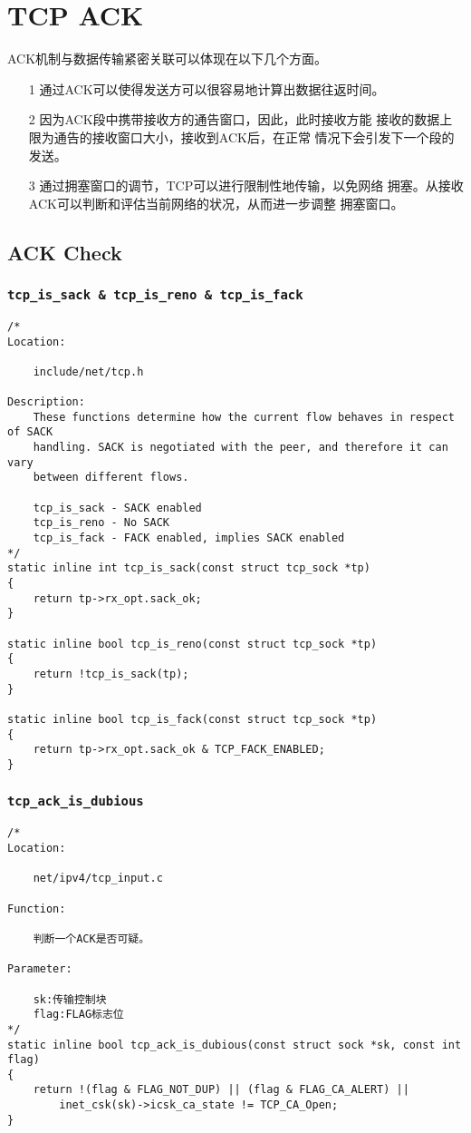 \section{TCP ACK}
    ACK机制与数据传输紧密关联可以体现在以下几个方面。
\begin{enumerate}
\item[1]    通过ACK可以使得发送方可以很容易地计算出数据往返时间。
\item[2]    因为ACK段中携带接收方的通告窗口，因此，此时接收方能
            接收的数据上限为通告的接收窗口大小，接收到ACK后，在正常
            情况下会引发下一个段的发送。
\item[3]    通过拥塞窗口的调节，TCP可以进行限制性地传输，以免网络
            拥塞。从接收ACK可以判断和评估当前网络的状况，从而进一步调整
            拥塞窗口。
\end{enumerate}
    \subsection{ACK Check}
        \subsubsection{\texttt{tcp_is_sack & tcp_is_reno & tcp_is_fack}}
\begin{verbatim}
/* 
Location:

    include/net/tcp.h

Description:
    These functions determine how the current flow behaves in respect of SACK
    handling. SACK is negotiated with the peer, and therefore it can vary
    between different flows.

    tcp_is_sack - SACK enabled
    tcp_is_reno - No SACK
    tcp_is_fack - FACK enabled, implies SACK enabled
*/
static inline int tcp_is_sack(const struct tcp_sock *tp)
{
    return tp->rx_opt.sack_ok;
}

static inline bool tcp_is_reno(const struct tcp_sock *tp)
{
    return !tcp_is_sack(tp);
}

static inline bool tcp_is_fack(const struct tcp_sock *tp)
{
    return tp->rx_opt.sack_ok & TCP_FACK_ENABLED;
}
\end{verbatim}
        \subsubsection{\texttt{tcp_ack_is_dubious}}
            \label{ACKCheck:tcp_ack_is_dubious}
\begin{verbatim}
/*
Location:

    net/ipv4/tcp_input.c

Function:

    判断一个ACK是否可疑。

Parameter:

    sk:传输控制块
    flag:FLAG标志位
*/
static inline bool tcp_ack_is_dubious(const struct sock *sk, const int flag)
{
    return !(flag & FLAG_NOT_DUP) || (flag & FLAG_CA_ALERT) ||
        inet_csk(sk)->icsk_ca_state != TCP_CA_Open;
}
\end{verbatim}

